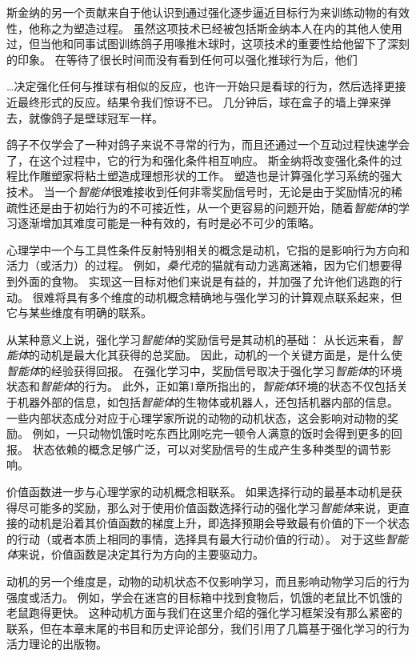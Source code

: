 斯金纳的另一个贡献来自于他认识到通过强化逐步逼近目标行为来训练动物的有效性，他称之为塑造过程。
虽然这项技术已经被包括斯金纳本人在内的其他人使用过，但当他和同事试图训练鸽子用喙推木球时，这项技术的重要性给他留下了深刻的印象。
在等待了很长时间而没有看到任何可以强化推球行为后，他们


…决定强化任何与推球有相似的反应，也许一开始只是看球的行为，然后选择更接近最终形式的反应。结果令我们惊讶不已。
几分钟后，球在盒子的墙上弹来弹去，就像鸽子是壁球冠军一样\cite{skinner1958reinforcement}。


鸽子不仅学会了一种对鸽子来说不寻常的行为，而且还通过一个互动过程快速学会了，在这个过程中，它的行为和强化条件相互响应。
斯金纳将改变强化条件的过程比作雕塑家将粘土塑造成理想形状的工作。
塑造也是计算强化学习系统的强大技术。
当一个\textit{智能体}很难接收到任何非零奖励信号时，无论是由于奖励情况的稀疏性还是由于初始行为的不可接近性，从一个更容易的问题开始，随着\textit{智能体}的学习逐渐增加其难度可能是一种有效的，有时是必不可少的策略。


心理学中一个与工具性条件反射特别相关的概念是动机，它指的是影响行为方向和活力（或活力）的过程。
例如，\textit{桑代克}的猫就有动力逃离迷箱，因为它们想要得到外面的食物。
实现这一目标对他们来说是有益的，并加强了允许他们逃跑的行动。
很难将具有多个维度的动机概念精确地与强化学习的计算观点联系起来，但它与某些维度有明确的联系。


从某种意义上说，强化学习\textit{智能体}的奖励信号是其动机的基础：
从长远来看，\textit{智能体}的动机是最大化其获得的总奖励。
因此，动机的一个关键方面是，是什么使\textit{智能体}的经验获得回报。
在强化学习中，奖励信号取决于强化学习\textit{智能体}的环境状态和\textit{智能体}的行为。
此外，正如第1章所指出的，\textit{智能体}环境的状态不仅包括关于机器外部的信息，如包括\textit{智能体}的生物体或机器人，还包括机器内部的信息。
一些内部状态成分对应于心理学家所说的动物的动机状态，这会影响对动物的奖励。
例如，一只动物饥饿时吃东西比刚吃完一顿令人满意的饭时会得到更多的回报。
状态依赖的概念足够广泛，可以对奖励信号的生成产生多种类型的调节影响。


价值函数进一步与心理学家的动机概念相联系。
如果选择行动的最基本动机是获得尽可能多的奖励，那么对于使用价值函数选择行动的强化学习\textit{智能体}来说，更直接的动机是沿着其价值函数的梯度上升，即选择预期会导致最有价值的下一个状态的行动（或者本质上相同的事情，选择具有最大行动价值的行动）。
对于这些\textit{智能体}来说，价值函数是决定其行为方向的主要驱动力。


动机的另一个维度是，动物的动机状态不仅影响学习，而且影响动物学习后的行为强度或活力。
例如，学会在迷宫的目标箱中找到食物后，饥饿的老鼠比不饥饿的老鼠跑得更快。
这种动机方面与我们在这里介绍的强化学习框架没有那么紧密的联系，但在本章末尾的书目和历史评论部分，我们引用了几篇基于强化学习的行为活力理论的出版物。


